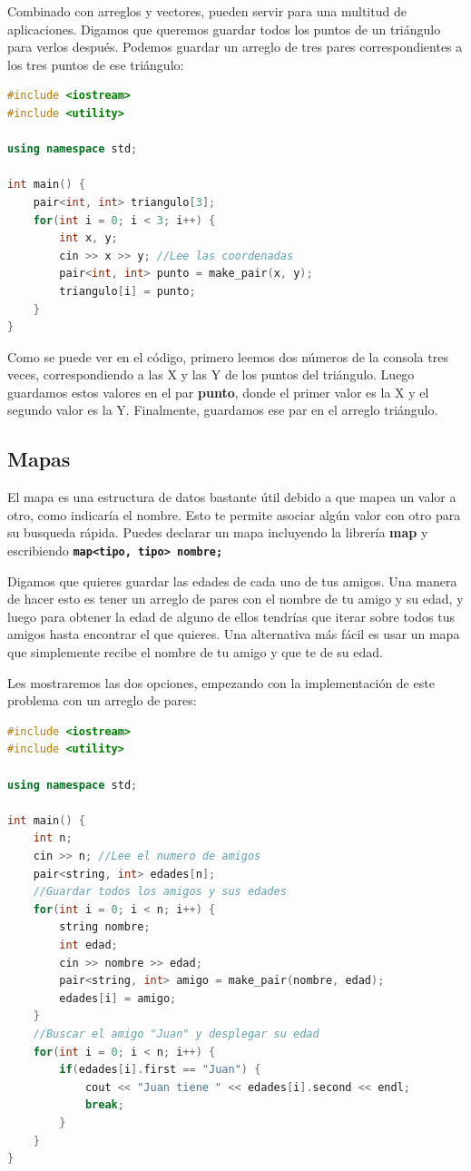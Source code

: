 \documentclass{article}
\begin{document}
Combinado con arreglos y vectores, pueden servir para una multitud de aplicaciones. Digamos que queremos guardar todos los puntos de un triángulo para verlos después. Podemos guardar un arreglo de tres pares correspondientes a los tres puntos de ese triángulo:

\begin{lstlisting}[language=C++, caption=Arreglo de pares]
#include <iostream>
#include <utility>

using namespace std;

int main() {
    pair<int, int> triangulo[3];
    for(int i = 0; i < 3; i++) {
        int x, y;
        cin >> x >> y; //Lee las coordenadas
        pair<int, int> punto = make_pair(x, y);
        triangulo[i] = punto;
    }
}
\end{lstlisting}

Como se puede ver en el código, primero leemos dos números de la consola tres veces, correspondiendo a las X y las Y de los puntos del triángulo. Luego guardamos estos valores en el par \textbf{punto}, donde el primer valor es la X y el segundo valor es la Y. Finalmente, guardamos ese par en el arreglo triángulo.

\subsection{Mapas}

El mapa es una estructura de datos bastante útil debido a que mapea un valor a otro, como indicaría el nombre. Esto te permite asociar algún valor con otro para su busqueda rápida. Puedes declarar un mapa incluyendo la librería \textbf{map} y escribiendo \textbf{\lstinline{map<tipo, tipo> nombre;}}

Digamos que quieres guardar las edades de cada uno de tus amigos. Una manera de hacer esto es tener un arreglo de pares con el nombre de tu amigo y su edad, y luego para obtener la edad de alguno de ellos tendrías que iterar sobre todos tus amigos hasta encontrar el que quieres. Una alternativa más fácil es usar un mapa que simplemente recibe el nombre de tu amigo y que te de su edad.

Les mostraremos las dos opciones, empezando con la implementación de este problema con un arreglo de pares:

\begin{lstlisting}[language=C++, caption=Implementación con pares]
#include <iostream>
#include <utility>

using namespace std;

int main() {
    int n;
    cin >> n; //Lee el numero de amigos
    pair<string, int> edades[n];
    //Guardar todos los amigos y sus edades
    for(int i = 0; i < n; i++) {
        string nombre;
        int edad;
        cin >> nombre >> edad;
        pair<string, int> amigo = make_pair(nombre, edad);
        edades[i] = amigo;
    }
    //Buscar el amigo "Juan" y desplegar su edad
    for(int i = 0; i < n; i++) {
        if(edades[i].first == "Juan") {
            cout << "Juan tiene " << edades[i].second << endl;
            break;
        }
    }
}
\end{lstlisting}
\end{document}
